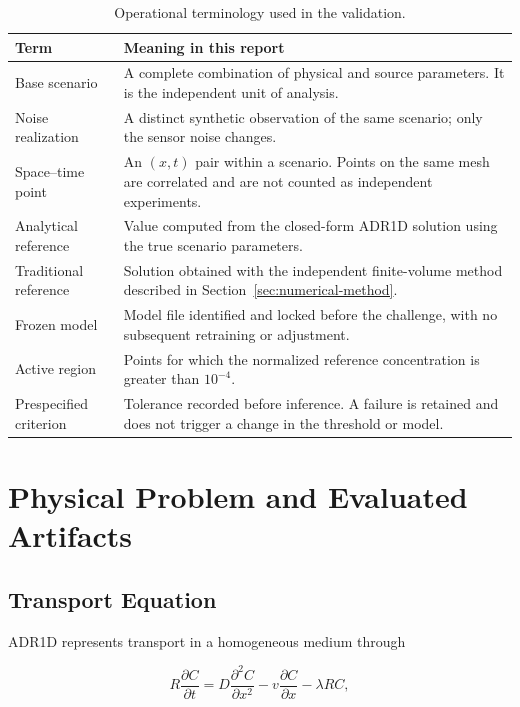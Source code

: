 \documentclass[11pt,a4paper]{article}
\begin{document}
\begin{table}[htbp]
\centering
\caption{Operational terminology used in the validation.}
\label{tab:vocabulary}
\small
\begin{tabularx}{\textwidth}{@{}>{\raggedright\arraybackslash}p{3.6cm}Y@{}}
\toprule
Term & Meaning in this report \\
\midrule
Base scenario & A complete combination of physical and source parameters. It
is the independent unit of analysis. \\
Noise realization & A distinct synthetic observation of the same scenario;
only the sensor noise changes. \\
Space--time point & An $(x,t)$ pair within a scenario. Points on the same mesh
are correlated and are not counted as independent experiments. \\
Analytical reference & Value computed from the closed-form ADR1D solution
using the true scenario parameters. \\
Traditional reference & Solution obtained with the independent finite-volume
method described in Section~\ref{sec:numerical-method}. \\
Frozen model & Model file identified and locked before the challenge, with no
subsequent retraining or adjustment. \\
Active region & Points for which the normalized reference concentration is
greater than $10^{-4}$. \\
Prespecified criterion & Tolerance recorded before inference. A failure is
retained and does not trigger a change in the threshold or model. \\
\bottomrule
\end{tabularx}
\end{table}

\section{Physical Problem and Evaluated Artifacts}

\subsection{Transport Equation}

ADR1D represents transport in a homogeneous medium through

\begin{equation}
R\frac{\partial C}{\partial t}
=D\frac{\partial^2 C}{\partial x^2}
-v\frac{\partial C}{\partial x}
-\lambda R C,
\label{eq:adr}
\end{equation}
\end{document}
